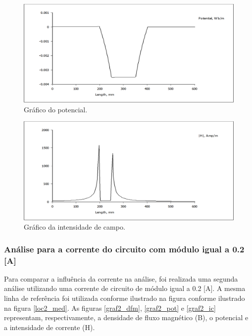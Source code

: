 \begin{figure}[H]
\centering
\includegraphics[scale=0.3]{img/assig1/linha_pot.png}
\caption[Gráfico do potencial]{Gráfico do potencial.}
\label{graf_pot}
\end{figure}

\begin{figure}[H]
\centering
\includegraphics[scale=0.3]{img/assig1/linha_H.png}
\caption[Gráfico da intensidade de campo]{Gráfico da intensidade de campo.}
\label{graf_ic}
\end{figure}

\subsubsection{Análise para a corrente do circuito com módulo igual a 0.2 [A]}
Para comparar a influência da corrente na análise, foi realizada uma segunda análise utilizando uma corrente de circuito de módulo igual a 0.2 [A]. A mesma linha de referência foi utilizada conforme ilustrado na figura conforme ilustrado na figura \ref{loc2_med}. As figuras \ref{graf2_dfm}, \ref{graf2_pot} e \ref{graf2_ic} representam, respectivamente, a densidade de fluxo magnético (B), o potencial e a intensidade de corrente (H).


